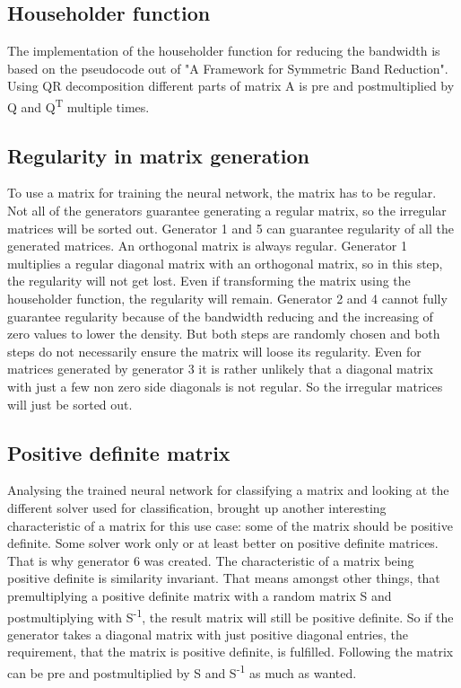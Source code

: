 \documentclass[parskip=full]{scrartcl}
\begin{document}
\subsection{Householder function}
The implementation of the householder function for reducing the bandwidth is based on the pseudocode out of "A Framework for Symmetric Band Reduction". 
Using QR decomposition different parts of matrix A is pre and postmultiplied by Q and Q\textsuperscript{T} multiple times.

\subsection{Regularity in matrix generation}
To use a matrix for training the neural network, the matrix has to be regular.
Not all of the generators guarantee generating a regular matrix, so the irregular matrices will be sorted out.
Generator 1 and 5 can guarantee regularity of all the generated matrices. An orthogonal matrix is always regular. 
Generator 1 multiplies a regular diagonal matrix with an orthogonal matrix, so in this step, the regularity will not get lost.
Even if transforming the matrix using the householder function, the regularity will remain.
Generator 2 and 4 cannot fully guarantee regularity because of the bandwidth reducing and the increasing of zero values to lower the density.
But both steps are randomly chosen and both steps do not necessarily ensure the matrix will loose its regularity.
Even for matrices generated by generator 3 it is rather unlikely that a diagonal matrix with just a few non zero side diagonals is not regular.
So the irregular matrices will just be sorted out.

\subsection{Positive definite matrix}
Analysing the trained neural network for classifying a matrix and looking at the different solver used for classification, brought up another interesting characteristic of a matrix for this use case: some of the matrix should be positive definite.
Some solver work only or at least better on positive definite matrices. 
That is why generator 6 was created. 
The characteristic of a matrix being positive definite is similarity invariant. 
That means amongst other things, that premultiplying a positive definite matrix with a random matrix S and postmultiplying with S\textsuperscript{-1}, the result matrix will still be positive definite. 
So if the generator takes a diagonal matrix with just positive diagonal entries, the requirement, that the matrix is positive definite, is fulfilled.
Following the matrix can be pre and postmultiplied by S and S\textsuperscript{-1} as much as wanted. 
\end{document}

